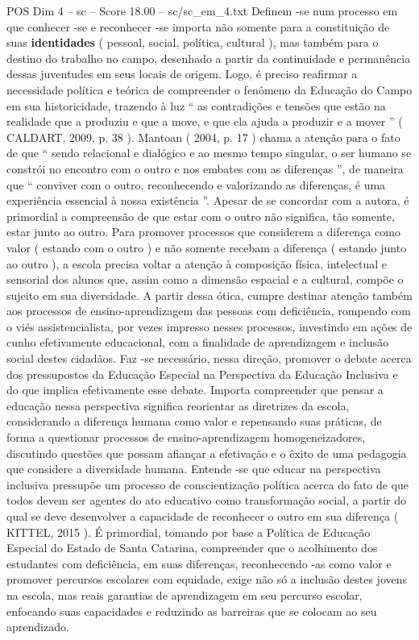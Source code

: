 \begin{textsample}{POS Dim 4 – sc – Score 18.00 – sc/sc\_em\_4.txt}
Definem -se num processo em que conhecer -se e reconhecer -se importa não somente para a constituição de suas \textbf{identidades} ( pessoal, social, política, cultural ), mas também para o destino do trabalho no campo, desenhado a partir da continuidade e permanência dessas juventudes em seus locais de origem.
Logo, é preciso reafirmar a necessidade política e teórica de compreender o fenômeno da Educação do Campo em sua historicidade, trazendo à luz “ as contradições e tensões que estão na realidade que a produziu e que a move, e que ela ajuda a produzir e a mover ” ( CALDART, 2009, p. 38 ).
Mantoan ( 2004, p. 17 ) chama a atenção para o fato de que “ sendo relacional e dialógico e ao mesmo tempo singular, o ser humano se constrói no encontro com o outro e nos embates com as diferenças ”, de maneira que “ conviver com o outro, reconhecendo e valorizando as diferenças, é uma experiência essencial à nossa existência ”.
Apesar de se concordar com a autora, é primordial a compreensão de que estar com o outro não significa, tão somente, estar junto ao outro.
Para promover processos que considerem a diferença como valor ( estando com o outro ) e não somente recebam a diferença ( estando junto ao outro ), a escola precisa voltar a atenção à composição física, intelectual e sensorial dos alunos que, assim como a dimensão espacial e a cultural, compõe o sujeito em sua diversidade.
A partir dessa ótica, cumpre destinar atenção também aos processos de ensino-aprendizagem das pessoas com deficiência, rompendo com o viés assistencialista, por vezes impresso nesses processos, investindo em ações de cunho efetivamente educacional, com a finalidade de aprendizagem e inclusão social destes cidadãos.
Faz -se necessário, nessa direção, promover o debate acerca dos pressupostos da Educação Especial na Perspectiva da Educação Inclusiva e do que implica efetivamente esse debate.
Importa compreender que pensar a educação nessa perspectiva significa reorientar as diretrizes da escola, considerando a diferença humana como valor e repensando suas práticas, de forma a questionar processos de ensino-aprendizagem homogeneizadores, discutindo questões que possam afiançar a efetivação e o êxito de uma pedagogia que considere a diversidade humana.
Entende -se que educar na perspectiva inclusiva pressupõe um processo de conscientização política acerca do fato de que todos devem ser agentes do ato educativo como transformação social, a partir do qual se deve desenvolver a capacidade de reconhecer o outro em sua diferença ( KITTEL, 2015 ).
É primordial, tomando por base a Política de Educação Especial do Estado de Santa Catarina, compreender que o acolhimento dos estudantes com deficiência, em suas diferenças, reconhecendo -as como valor e promover percursos escolares com equidade, exige não só a inclusão destes jovens na escola, mas reais garantias de aprendizagem em seu percurso escolar, enfocando suas capacidades e reduzindo as barreiras que se colocam ao seu aprendizado.

\end{textsample}
